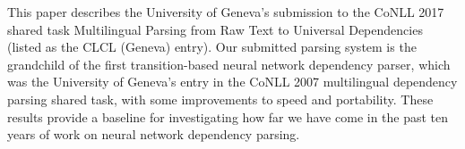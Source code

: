 This paper describes the University of Geneva's submission to the CoNLL 2017 shared task Multilingual Parsing from Raw Text to Universal Dependencies (listed as the CLCL (Geneva) entry).  Our submitted parsing system is the grandchild of the first transition-based neural network dependency parser, which was the University of Geneva's entry in the CoNLL 2007 multilingual dependency parsing shared task, with some improvements to speed and portability.  These results provide a baseline for investigating how far we have come in the past ten years of work on neural network dependency parsing.
